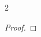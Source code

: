 \documentclass{article}
\newtheorem{proof}{Proof}[theorem]
\newcommand{\R}{\mathbb{R}}                                 %
\newcommand{\pmat}[1]{\begin{pmatrix}#1\end{pmatrix}}
\begin{document}
\begin{multicols}{2}
\begin{proof}



\end{proof}
\end{multicols}
\end{document}
